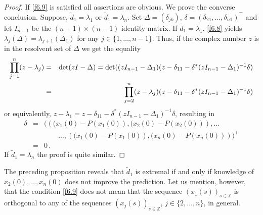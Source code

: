\documentclass{amsart}
\begin{document}
{\begin{proof}
If \eqref{f6.9} is satisfied all assertions are obvious. We prove the converse conclusion. Suppose, $\tilde{d}_1=\lambda_1$ or $\tilde{d}_1=\lambda_n$. Set $\Delta = (\delta_{jk})$, $\delta = (\delta_{21},\ldots,\delta_{n1})^\top$ and let $I_{n-1}$ be the $(n-1) \times (n-1)$ identity matrix. If $\tilde{d}_1=\lambda_1$, \eqref{f6.8} yields $\lambda_j(\Delta)=\lambda_{j+1}(\Delta_1)$ for any $j \in \{ 1,\ldots,n-1 \}$. Thus, if the complex number $z$ is in the resolvent set of $\Delta$ we get the equality
\begin{eqnarray*}
    \prod_{j=1}^n (z-\lambda_j) & = & {\rm det}(zI-\Delta) = {\rm det}((zI_{n-1}-\Delta_1) (z-\delta_{11}- \delta^* (zI_{n-1}-\Delta_1)^{-1} \delta) \\
    & = & \prod_{j=2}^n (z-\lambda_j) (z-\delta_{11}- \delta^* (zI_{n-1}-\Delta_1)^{-1} \delta)
\end{eqnarray*}
or equivalently, $z-\lambda_1=z-\delta_{11}-\delta^*(zI_{n-1}-\Delta_1)^{-1} \delta$, resulting in 
\begin{eqnarray*}
\delta & = & (\left( (x_1(0)-{P}(x_1(0)),  (x_2(0)-{P}(x_2(0))\right), \ldots  \\
& & \quad \quad \ldots , \left((x_1(0)-{P}(x_1(0)),  (x_n(0)-{P}(x_n(0))\right) )^\top \\
& = & 0 \, . 
\end{eqnarray*}
If $\tilde{d}_1=\lambda_n$ the proof is quite similar. 
\end{proof}        

The preceding proposition reveals that $\tilde{d}_1$ is extremal if and only if knowledge of $x_2(0),\ldots,x_n(0)$ does not improve the prediction. Let us mention, however, that the condition \eqref{f6.9} does not mean that the sequence $(x_1(s))_{s \in {\mathbb Z}}$ is orthogonal to any of the sequences $(x_j(s))_{s \in {\mathbb Z}}$, $j\in \{ 2,\ldots,n \}$, in general. 

}
\end{document}
